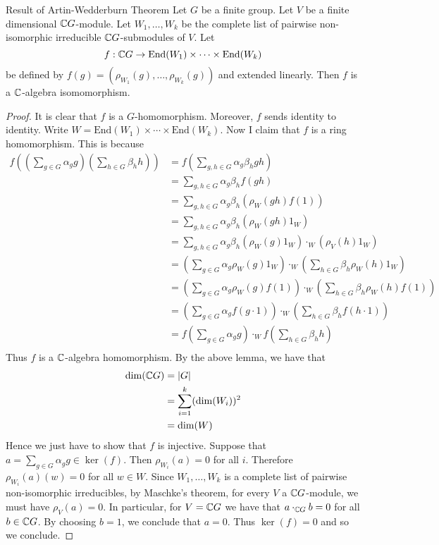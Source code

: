 \documentclass[a4paper]{article}
\begin{document}
\begin{thm}{Result of Artin-Wedderburn Theorem}{} Let $G$ be a finite group. Let $V$ be a finite dimensional $\mathbb{C} G$-module. Let $W_1,\dots, W_k$ be the complete list of pairwise non-isomorphic irreducible $\mathbb{C} G$-submodules of $V$. Let $$f:\mathbb{C} G\to\text{End}(W_1)\times\cdots\times\text{End}(W_k)$$ be defined by $f(g)=(\rho_{W_1}(g),\dots,\rho_{W_k}(g))$ and extended linearly. Then $f$ is a $\mathbb{C}$-algebra isomomorphism. \tcbline
\begin{proof}
It is clear that $f$ is a $G$-homomorphism. Moreover, $f$ sends identity to identity. Write $W=\text{End}(W_1)\times\cdots\times\text{End}(W_k)$. Now I claim that $f$ is a ring homomorphism. This is because
\begin{align*}
f\left(\left(\sum_{g\in G}\alpha_gg\right)\left(\sum_{h\in G}\beta_hh\right)\right)&=f\left(\sum_{g,h\in G}\alpha_g\beta_hgh\right)\\
&=\sum_{g,h\in G}\alpha_g\beta_hf(gh)\\
&=\sum_{g,h\in G}\alpha_g\beta_h\left(\rho_W(gh)f(1)\right)\\
&=\sum_{g,h\in G}\alpha_g\beta_h\left(\rho_W(gh)1_W\right)\\
&=\sum_{g,h\in G}\alpha_g\beta_h\left(\rho_W(g)1_W\right)\cdot_W(\rho_V(h)1_W)\\
&=\left(\sum_{g\in G}\alpha_g\rho_W(g)1_W\right)\cdot_W\left(\sum_{h\in G}\beta_h\rho_W(h)1_W\right)\tag{$W$ is a $\C G$-module}\\
&=\left(\sum_{g\in G}\alpha_g\rho_W(g)f(1)\right)\cdot_W\left(\sum_{h\in G}\beta_h\rho_W(h)f(1)\right)\\
&=\left(\sum_{g\in G}\alpha_gf(g\cdot 1)\right)\cdot_W\left(\sum_{h\in G}\beta_hf(h\cdot 1)\right)\\
&=f\left(\sum_{g\in G}\alpha_gg\right)\cdot_Wf\left(\sum_{h\in G}\beta_hh\right)\\
\end{align*}
Thus $f$ is a $\mathbb{C}$-algebra homomorphism. By the above lemma, we have that 
\begin{align*}
\dim(\mathbb{C} G)&=\abs{G}\\
&=\sum_{i=1}^k(\dim(W_i))^2\\
&=\dim(W)
\end{align*}
Hence we just have to show that $f$ is injective. Suppose that $a=\sum_{g\in G}\alpha_gg\in\ker(f)$. Then $\rho_{W_i}(a)=0$ for all $i$. Therefore $\rho_{W_i}(a)(w)=0$ for all $w\in W$. Since $W_1,\dots,W_k$ is a complete list of pairwise non-isomorphic irreducibles, by Maschke's theorem, for every $V$ a $\mathbb{C} G$-module, we must have $\rho_V(a)=0$. In particular, for $V=\mathbb{C} G$ we have that $a\cdot_{\mathbb{C} G}b=0$ for all $b\in\mathbb{C} G$. By choosing $b=1$, we conclude that $a=0$. Thus $\ker(f)=0$ and so we conclude. 
\end{proof}
\end{thm}
\end{document}
